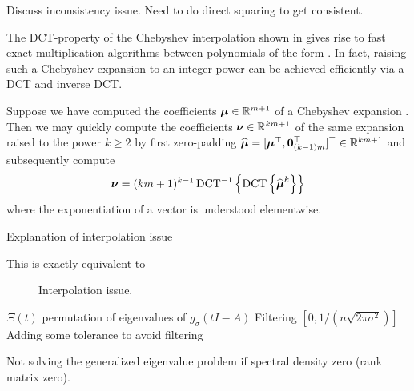 Discuss inconsistency issue. Need to do direct squaring to get consistent.

The \gls{DCT}-property of the Chebyshev interpolation shown in 
gives rise to fast exact multiplication algorithms between polynomials
of the form  \cite[Proposition~3.1]{baszenski1997cosine}.
In fact, raising such a Chebyshev expansion to an integer power can be achieved
efficiently via a \gls{DCT} and inverse \gls{DCT}.

Suppose we have computed the coefficients $\boldsymbol{\mu} \in \mathbb{R}^{m+1}$
of a Chebyshev expansion .
Then we may quickly compute the coefficients $\boldsymbol{\nu} \in \mathbb{R}^{km+1}$
of the same expansion raised to the power $k \geq 2$ by first zero-padding
$\widehat{\boldsymbol{\mu}} = [\boldsymbol{\mu}^{\top}, \boldsymbol{0}_{(k-1)m}^{\top}]^{\top} \in \mathbb{R}^{km+1}$
and subsequently compute
\begin{equation}
    \boldsymbol{\nu} = (km + 1)^{k - 1} \operatorname{DCT}^{-1}\left\{ \operatorname{DCT}\left\{\widehat{\boldsymbol{\mu}}^{k}\right\} \right\}
    \label{equ:3-nystrom-chebyshev-square-coefficients}
\end{equation}
where the exponentiation of a vector is understood elementwise.

Explanation of interpolation issue \cite{lin2017randomized}

This is exactly equivalent to \cite[Algorithm~5]{lin2017randomized}
\begin{figure}[ht]
    \centering
    
    \caption{Interpolation issue.}
    \label{fig:3-nystrom-interpolation-issue}
\end{figure}

$\Xi(t)$ permutation of eigenvalues of $g_{\sigma}(tI - A)$
Filtering $[0, 1 / (n \sqrt{2 \pi \sigma^2})]$ \cite{lin2017randomized}
Adding some tolerance to avoid filtering

Not solving the generalized eigenvalue problem if spectral density zero (rank matrix zero).

